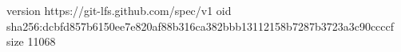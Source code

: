 version https://git-lfs.github.com/spec/v1
oid sha256:dcbfd857b6150ee7e820af88b316ca382bbb13112158b7287b3723a3c90ccccf
size 11068

